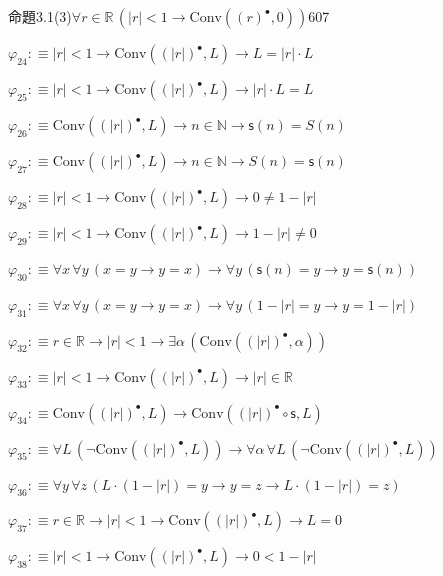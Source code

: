 \begin{fullproof}{命題3.1(3)}{$\forall r \in \mathbb{R}\,(\lvert r \rvert < 1 \to \mathrm{Conv}({(r)^{\bullet}},0))$}{607}
\begin{abbrevlist}
\item $\varphi_{24} :\equiv \lvert r \rvert < 1 \to \mathrm{Conv}({(\lvert r \rvert)^{\bullet}},L) \to L = \lvert r \rvert \cdot L$
\item $\varphi_{25} :\equiv \lvert r \rvert < 1 \to \mathrm{Conv}({(\lvert r \rvert)^{\bullet}},L) \to \lvert r \rvert \cdot L = L$
\item $\varphi_{26} :\equiv \mathrm{Conv}({(\lvert r \rvert)^{\bullet}},L) \to n \in \mathbb{N} \to \mathsf{s}(n) = S(n)$
\item $\varphi_{27} :\equiv \mathrm{Conv}({(\lvert r \rvert)^{\bullet}},L) \to n \in \mathbb{N} \to S(n) = \mathsf{s}(n)$
\item $\varphi_{28} :\equiv \lvert r \rvert < 1 \to \mathrm{Conv}({(\lvert r \rvert)^{\bullet}},L) \to 0 \neq 1 - \lvert r \rvert$
\item $\varphi_{29} :\equiv \lvert r \rvert < 1 \to \mathrm{Conv}({(\lvert r \rvert)^{\bullet}},L) \to 1 - \lvert r \rvert \neq 0$
\item $\varphi_{30} :\equiv \forall x\,\forall y\,(x = y \to y = x) \to \forall y\,(\mathsf{s}(n) = y \to y = \mathsf{s}(n))$
\item $\varphi_{31} :\equiv \forall x\,\forall y\,(x = y \to y = x) \to \forall y\,(1 - \lvert r \rvert = y \to y = 1 - \lvert r \rvert)$
\item $\varphi_{32} :\equiv r \in \mathbb{R} \to \lvert r \rvert < 1 \to \exists \alpha\,(\mathrm{Conv}({(\lvert r \rvert)^{\bullet}},\alpha))$
\item $\varphi_{33} :\equiv \lvert r \rvert < 1 \to \mathrm{Conv}({(\lvert r \rvert)^{\bullet}},L) \to \lvert r \rvert \in \mathbb{R}$
\item $\varphi_{34} :\equiv \mathrm{Conv}({(\lvert r \rvert)^{\bullet}},L) \to \mathrm{Conv}({(\lvert r \rvert)^{\bullet}} \circ \mathsf{s},L)$
\item $\varphi_{35} :\equiv \forall L\,(\neg \mathrm{Conv}({(\lvert r \rvert)^{\bullet}},L)) \to \forall \alpha\,\forall L\,(\neg \mathrm{Conv}({(\lvert r \rvert)^{\bullet}},L))$
\item $\varphi_{36} :\equiv \forall y\,\forall z\,(L \cdot (1 - \lvert r \rvert) = y \to y = z \to L \cdot (1 - \lvert r \rvert) = z)$
\item $\varphi_{37} :\equiv r \in \mathbb{R} \to \lvert r \rvert < 1 \to \mathrm{Conv}({(\lvert r \rvert)^{\bullet}},L) \to L = 0$
\item $\varphi_{38} :\equiv \lvert r \rvert < 1 \to \mathrm{Conv}({(\lvert r \rvert)^{\bullet}},L) \to 0 < 1 - \lvert r \rvert$

\end{abbrevlist}
\end{fullproof}
